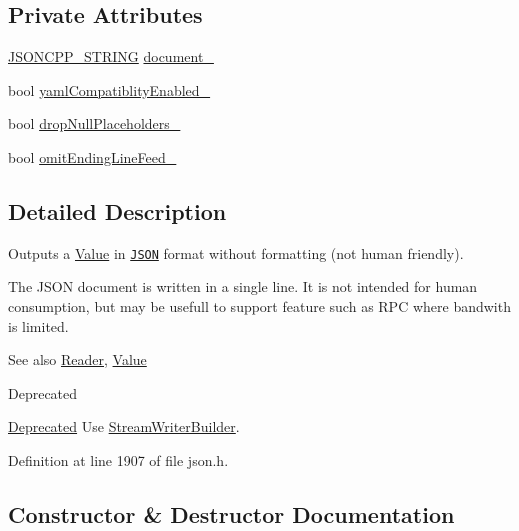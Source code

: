 \subsection*{Private Attributes}
\begin{DoxyCompactItemize}
\item 
\hyperlink{json_8h_a1e723f95759de062585bc4a8fd3fa4be}{J\+S\+O\+N\+C\+P\+P\+\_\+\+S\+T\+R\+I\+NG} \hyperlink{class_json_1_1_fast_writer_a5e08c44579db8704dba1ebe37d39fdba}{document\+\_\+}
\item 
bool \hyperlink{class_json_1_1_fast_writer_a4c4c1911179bf472d24492915b0e489a}{yaml\+Compatiblity\+Enabled\+\_\+}
\item 
bool \hyperlink{class_json_1_1_fast_writer_a97e9d4ff84b59a48756dcc27a71b5904}{drop\+Null\+Placeholders\+\_\+}
\item 
bool \hyperlink{class_json_1_1_fast_writer_abd6e13851db6dcf59d84af68d48d50ac}{omit\+Ending\+Line\+Feed\+\_\+}
\end{DoxyCompactItemize}


\subsection{Detailed Description}
Outputs a \hyperlink{class_json_1_1_value}{Value} in \href{http://www.json.org}{\tt J\+S\+ON} format without formatting (not human friendly). 

The J\+S\+ON document is written in a single line. It is not intended for \textquotesingle{}human\textquotesingle{} consumption, but may be usefull to support feature such as R\+PC where bandwith is limited. \begin{DoxySeeAlso}{See also}
\hyperlink{class_json_1_1_reader}{Reader}, \hyperlink{class_json_1_1_value}{Value} 
\end{DoxySeeAlso}
\begin{DoxyRefDesc}{Deprecated}
\item[\hyperlink{deprecated__deprecated000008}{Deprecated}]Use \hyperlink{class_json_1_1_stream_writer_builder}{Stream\+Writer\+Builder}. \end{DoxyRefDesc}


Definition at line 1907 of file json.\+h.



\subsection{Constructor \& Destructor Documentation}
\mbox{\label{class_json_1_1_fast_writer_a1bbc73ce1a1cc7b09cd1e02db3905170}} 
